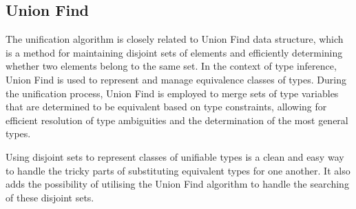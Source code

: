 \documentclass{l4proj}
\begin{document}


\subsection*{Union Find}
The unification algorithm is closely related to Union Find data structure, which is a method for maintaining disjoint sets of elements and efficiently determining whether two elements belong to the same set.
In the context of type inference, Union Find is used to represent and manage equivalence classes of types.
During the unification process, Union Find is employed to merge sets of type variables that are determined to be equivalent based on type constraints, allowing for efficient resolution of type ambiguities and the determination of the most general types.

Using disjoint sets to represent classes of unifiable types is a clean and easy way to handle the tricky parts of substituting equivalent types for one another.
It also adds the possibility of utilising the Union Find algorithm to handle the searching of these disjoint sets.


\end{document}
